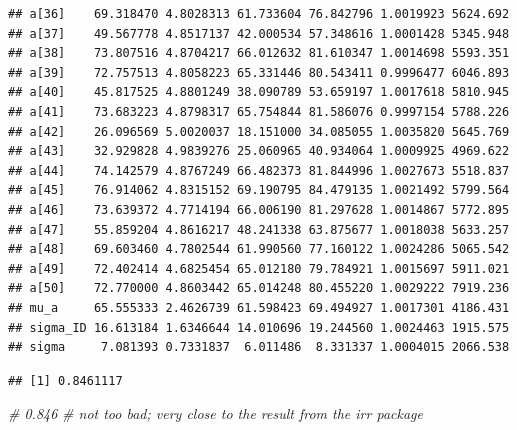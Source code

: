 \documentclass[
]{book}
\newenvironment{Shaded}{\begin{snugshade}}{\end{snugshade}}
\newcommand{\CommentTok}[1]{\textcolor[rgb]{0.56,0.35,0.01}{\textit{#1}}}
\newcommand{\DecValTok}[1]{\textcolor[rgb]{0.00,0.00,0.81}{#1}}
\newcommand{\FloatTok}[1]{\textcolor[rgb]{0.00,0.00,0.81}{#1}}
\newcommand{\FunctionTok}[1]{\textcolor[rgb]{0.13,0.29,0.53}{\textbf{#1}}}
\newcommand{\NormalTok}[1]{#1}
\newcommand{\OtherTok}[1]{\textcolor[rgb]{0.56,0.35,0.01}{#1}}
\newcommand{\SpecialCharTok}[1]{\textcolor[rgb]{0.81,0.36,0.00}{\textbf{#1}}}
\begin{document}
\begin{verbatim}
## a[36]    69.318470 4.8028313 61.733604 76.842796 1.0019923 5624.692
## a[37]    49.567778 4.8517137 42.000534 57.348616 1.0001428 5345.948
## a[38]    73.807516 4.8704217 66.012632 81.610347 1.0014698 5593.351
## a[39]    72.757513 4.8058223 65.331446 80.543411 0.9996477 6046.893
## a[40]    45.817525 4.8801249 38.090789 53.659197 1.0017618 5810.945
## a[41]    73.683223 4.8798317 65.754844 81.586076 0.9997154 5788.226
## a[42]    26.096569 5.0020037 18.151000 34.085055 1.0035820 5645.769
## a[43]    32.929828 4.9839276 25.060965 40.934064 1.0009925 4969.622
## a[44]    74.142579 4.8767249 66.482373 81.844996 1.0027673 5518.837
## a[45]    76.914062 4.8315152 69.190795 84.479135 1.0021492 5799.564
## a[46]    73.639372 4.7714194 66.006190 81.297628 1.0014867 5772.895
## a[47]    55.859204 4.8616217 48.241338 63.875677 1.0018038 5633.257
## a[48]    69.603460 4.7802544 61.990560 77.160122 1.0024286 5065.542
## a[49]    72.402414 4.6825454 65.012180 79.784921 1.0015697 5911.021
## a[50]    72.770000 4.8603442 65.014248 80.455220 1.0029222 7919.236
## mu_a     65.555333 2.4626739 61.598423 69.494927 1.0017301 4186.431
## sigma_ID 16.613184 1.6346644 14.010696 19.244560 1.0024463 1915.575
## sigma     7.081393 0.7331837  6.011486  8.331337 1.0004015 2066.538
\end{verbatim}

\begin{Shaded}
\end{Shaded}

\begin{verbatim}
## [1] 0.8461117
\end{verbatim}

\begin{Shaded}
\begin{Highlighting}[]
\CommentTok{\# 0.846}
\CommentTok{\# not too bad; very close to the result from the irr package}
\end{Highlighting}
\end{Shaded}
\end{document}
